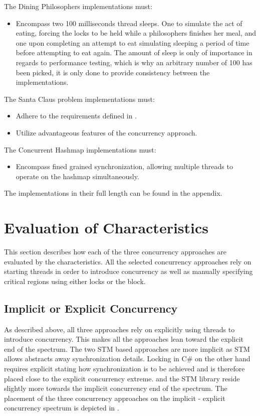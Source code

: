 The Dining Philosophers implementations must:
\begin{itemize}
	\item Encompass two 100 milliseconds thread sleeps. One to simulate the act of eating, forcing the locks to be held while a philosophers finishes her meal, and one upon completing an attempt to eat simulating sleeping a period of time before attempting to eat again. The amount of sleep is only of importance in regards to performance testing, which is why an arbitrary number of 100 has been picked, it is only done to provide consistency between the implementations.
\end{itemize}

The Santa Claus problem implementations must:
\begin{itemize}
	\item Adhere to the requirements defined in .
	\item Utilize advantageous features of the concurrency approach.
\end{itemize}

The Concurrent Hashmap implementations must:
\begin{itemize}
	\item Encompass fined grained synchronization, allowing multiple threads to operate on the hashmap simultaneously.
\end{itemize}
The implementations in their full length can be found in the appendix.

\section{Evaluation of Characteristics}
This section describes how each of the three concurrency approaches are evaluated by the characteristics.
All the selected concurrency approaches rely on starting threads in order to introduce concurrency as well as manually specifying critical regions using either locks or the  block. 
\subsection{Implicit or Explicit Concurrency}
As described above, all three approaches rely on explicitly using threads to introduce concurrency. This makes all the approaches lean toward the explicit end of the spectrum. The two \ac{STM} based approaches are more implicit as \ac{STM} allows abstracts away synchronization details. Locking in C\# on the other hand requires explicit stating how synchronization is to be achieved and is therefore placed close to the explicit concurrency extreme. \stmnamesp and the \ac{STM} library reside slightly more towards the implicit concurrency end of the spectrum. The placement of the three concurrency approaches on the implicit - explicit concurrency spectrum is depicted in .


